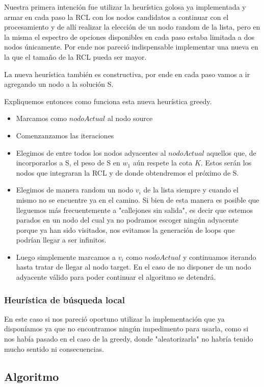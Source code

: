 Nuestra primera intenci\'on fue utilizar la heur\'istica golosa ya implementada y armar en cada paso la RCL con los nodos candidatos a continuar con el procesamiento y de all\'i realizar la elecci\'on de un nodo random de la lista, pero en la misma el espectro de opciones disponibles en cada paso estaba limitada a dos nodos \'unicamente. 
Por ende nos pareci\'o indispensable implementar una nueva en la que el tama\~no de la RCL pueda ser mayor.

La nueva heur\'istica tambi\'en es constructiva, por ende en cada paso vamos a ir agregando un nodo a la soluci\'on S.

Expliquemos entonces como funciona esta nueva heur\'istica greedy.

\begin{itemize}
\item Marcamos como $nodoActual$ al nodo source
\item Comenzanzamos las iteraciones
\item Elegimos de entre todos los nodos adyacentes al $nodoActual$ aquellos que, de incorporarlos a S, el peso de S en $w_1$ a\'un respete la cota $K$.
Estos ser\'an los nodos que integraran la RCL y de donde obtendremos el pr\'oximo de S.
\item Elegimos de manera random un nodo $v_i$ de la lista siempre y cuando el mismo no se encuentre ya en el camino. Si bien de esta manera es posible que lleguemos m\'as frecuentemente a "callejones sin salida", es decir que estemos parados en un nodo del cual ya no podramos escoger ning\'un adyacente porque ya han sido visitados, nos evitamos la generaci\'on de loops que podr\'ian llegar a ser infinitos.
\item Luego simplemente marcamos a $v_i$ como $nodoActual$ y continuamos iterando hasta tratar de llegar al nodo target. En el caso de no disponer de un nodo adyacente v\'alido para poder continuar el algoritmo se detendr\'a.
\end{itemize}


\subsubsection{Heur\'istica de b\'usqueda local}
En este caso si nos pareci\'o oportuno utilizar la implementaci\'on que ya dispon\'iamos ya que no encontramos ning\'un impedimento para usarla, como si nos hab\'ia pasado en el caso de la greedy, donde "aleatorizarla" no habr\'ia tenido mucho sentido ni consecuencias.


\subsection{Algoritmo}

